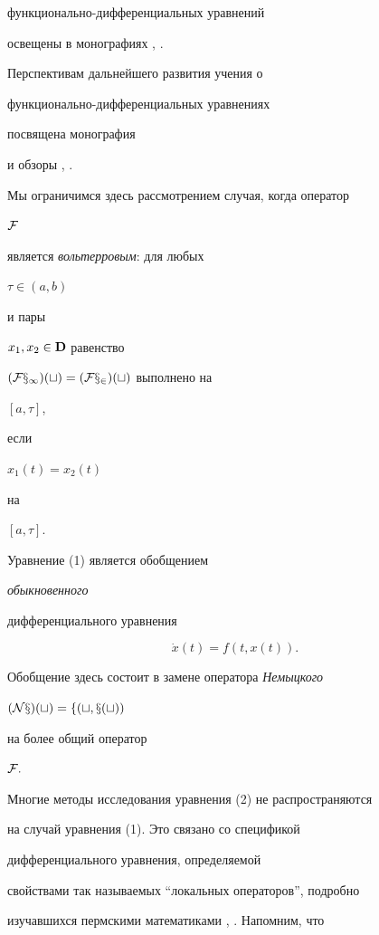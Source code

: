 функционально-дифференциальных уравнений


освещены в монографиях \cite{Az1}, \cite{Az2}.


Перспективам дальнейшего развития учения о


функционально-дифференциальных уравнениях


посвящена монография


\cite{Az3} и обзоры \cite{Az4}, \cite{Az5}.


Мы ограничимся здесь рассмотрением случая, когда оператор


$\cal F$


является {\it вольтерровым}: для любых


$\tau\in(a,b)$


и пары


$x_1, x_2\in\bold D$ равенство


$(\cal F x_1)(t) = (\cal F x_2)(t)$ выполнено на


$[a,\tau]$,


если


$x_1(t) = x_2(t)$


на


$[a,\tau].$





Уравнение (1) является обобщением {\it обыкновенного


дифференциального уравнения}


\begin{equation}


\Dot x (t) = f(t,x(t)).


\end{equation}


Обобщение здесь состоит в замене оператора {\it Немыцкого}


$(\cal N x)(t) = f(t,x(t))$


на более общий оператор


$\cal F.$





Многие методы исследования уравнения (2) не распространяются


на случай уравнения (1). Это связано со спецификой


дифференциального уравнения, определяемой


свойствами так называемых ``локальных операторов'', подробно


изучавшихся пермскими математиками \cite{Shr}, \cite{Pon}. Напомним, что


